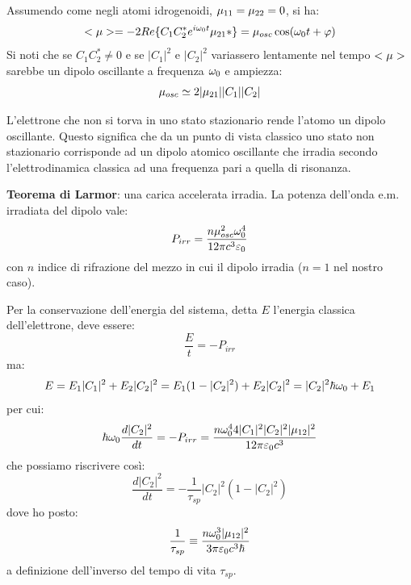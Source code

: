 Assumendo come negli atomi idrogenoidi, $\*\mu_{11} = \*\mu_{22} = 0$, si ha:
\begin{equation}
    <\*\mu> = -2 Re\{C_1 C_2^* e^{i\w_0t} \*\mu_{21}*\} = \mu_{osc} \cos(\w_0 t + \varphi)
\end{equation}
Si noti che se $C_1 C_2^* \neq 0$ e se $|C_1|^2$ e $|C_2|^2$ variassero lentamente nel tempo $<\*\mu>$ sarebbe un dipolo oscillante a frequenza $\omega_0$ e ampiezza:
\begin{equation}
    \mu_{osc} \simeq 2 |\*\mu_{21}||C_1||C_2|
\end{equation}

L'elettrone che non si torva in uno stato stazionario rende l'atomo un dipolo oscillante. Questo significa che da un punto di vista classico uno stato non stazionario corrisponde ad un dipolo atomico oscillante che irradia secondo l'elettrodinamica classica ad una frequenza pari a quella di risonanza.

\textbf{Teorema di Larmor}: una carica accelerata irradia.
La potenza dell'onda e.m. irradiata del dipolo vale:
\begin{equation}
    P_{irr} = \frac{n \mu_{osc}^2 \omega_0^4}{12 \pi c^3 \varepsilon_0}
\end{equation}
con $n$ indice di rifrazione del mezzo in cui il dipolo irradia ($n=1$ nel nostro caso).

Per la conservazione dell'energia del sistema, detta $E$ l'energia classica dell'elettrone, deve essere:
\begin{equation}
    \frac{E}{t} = - P_{irr}
\end{equation}
ma:
\begin{equation}
    E = E_1 |C_1|^2 + E_2 |C_2|^2 = E_1 (1 - |C_2|^2) + E_2 |C_2|^2 = |C_2|^2 \hbar \omega_0 + E_1
\end{equation}
per cui:
\begin{equation}
    \hbar \w_0 \frac{d|C_2|^2}{dt} = - P_{irr} = \frac{n \w_0^4 4 |C_1|^2 |C_2|^2 |\*\mu_{12}|^2}{12 \pi \varepsilon_0 c^3}
\end{equation}
che possiamo riscrivere così:
\begin{equation}
    \frac{d|C_2|^2}{dt} = -\frac{1}{\tau_{sp}}|C_2|^2 (1 - |C_2|^2)
\end{equation}
dove ho posto:
\begin{equation}
    \frac{1}{\tau_{sp}} \equiv \frac{n \w_0^3 |\*\mu_{12}|^2}{3 \pi \varepsilon_0 c^3 \hbar}
\end{equation}
a definizione dell'inverso del tempo di vita $\tau_{sp}$.

